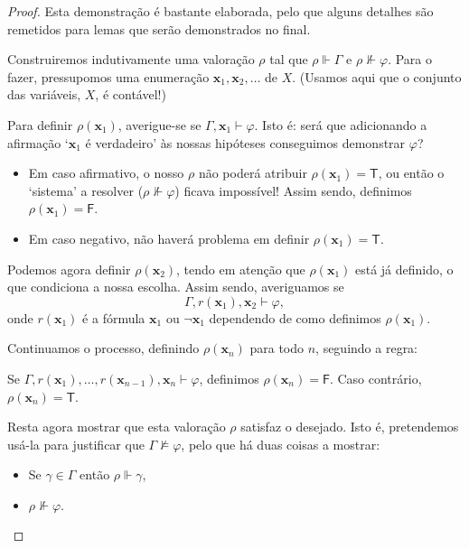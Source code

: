 \documentclass{report}
\theoremstyle{definition}
\theoremstyle{remark}
\renewcommand{\bf}[1]{\mathbf{#1}}
\newcommand{\lt}{\mathsf{T}}
\newcommand{\lf}{\mathsf{F}}
\begin{document}
	\begin{proof}
	Esta demonstração é bastante elaborada, pelo que alguns detalhes são remetidos para lemas que serão demonstrados no final.
	
	Construiremos indutivamente uma valoração $\rho$ tal que $\rho \Vdash \Gamma$ e $\rho \nVdash \varphi$. Para o fazer, pressupomos uma enumeração $\bf x_1, \bf x_2, \dots$ de $X$. (Usamos aqui que o conjunto das variáveis, $X$, é contável!)
	
	Para definir $\rho(\bf x_1)$, averigue-se se $\Gamma, \bf x_1 \vdash \varphi$. Isto é: será que adicionando a afirmação `$\bf x_1$ é verdadeiro' às nossas hipóteses conseguimos demonstrar $\varphi$?
	
	\begin{itemize}
	\item Em caso afirmativo, o nosso $\rho$ não poderá atribuir $\rho(\bf x_1) = \lt$, ou então o `sistema' a resolver ($\rho \nVdash \varphi$) ficava impossível! Assim sendo, definimos $\rho(\bf x_1) = \lf$. 
	
	\item Em caso negativo, não haverá problema em definir $\rho(\bf x_1) = \lt$.
	\end{itemize}
	
	Podemos agora definir $\rho(\bf x_2)$, tendo em atenção que $\rho(\bf x_1)$ está já definido, o que condiciona a nossa escolha. Assim sendo, averiguamos se
	\[\Gamma, r(\bf x_1), \bf x_2 \vdash \varphi,\]
	onde $r(\bf x_1)$ é a fórmula $\bf x_1$ ou $\neg \bf x_1$ dependendo de como definimos $\rho(\bf x_1)$.
	
	Continuamos o processo, definindo $\rho(\bf x_n)$ para todo $n$, seguindo a regra:

	\begin{center}
	Se $\Gamma, r(\bf x_1), \dots, r(\bf x_{n-1}), \bf x_n \vdash \varphi$, definimos $\rho(\bf x_n) = \lf$. Caso contrário, $\rho(\bf x_n) = \lt$.
	\end{center}
	
	Resta agora mostrar que esta valoração $\rho$ satisfaz o desejado. Isto é, pretendemos usá-la para justificar que $\Gamma \nvDash \varphi$, pelo que há duas coisas a mostrar:
	
	\begin{itemize}
	\item Se $\gamma \in \Gamma$ então $\rho \Vdash \gamma$,
	
	\item $\rho \nVdash \varphi$.
	\end{itemize}
	

\end{proof}
\end{document}
